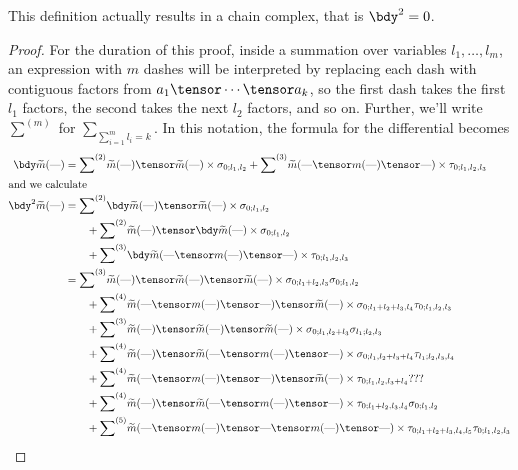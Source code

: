 \documentclass[11pt,leqno]{amsart}
\begin{document}
\begin{lem}
This definition actually results in a chain complex, that is $\bdy^2 = 0$.
\end{lem}
\begin{proof}
\newcommand{\T}{\text{---}}
\newcommand{\ssum}[1]{{\sum}^{(#1)}}
For the duration of this proof, inside a summation over variables $l_1, \ldots, l_m$, an expression with $m$ dashes will be interpreted
by replacing each dash with contiguous factors from $a_1 \tensor \cdots \tensor a_k$, so the first dash takes the first $l_1$ factors, the second
takes the next $l_2$ factors, and so on. Further, we'll write $\ssum{m}$ for $\sum_{\sum_{i=1}^m l_i = k}$.
In this notation, the formula for the differential becomes
\begin{align}
\notag
\bdy \tm(\T) & = \ssum{2} \tm(\T) \tensor \tm(\T) \times \sigma_{0;l_1,l_2} + \ssum{3} \tm(\T \tensor m(\T) \tensor \T) \times \tau_{0;l_1,l_2,l_3} \\
\intertext{and we calculate}
\notag
\bdy^2 \tm(\T) & = \ssum{2} \bdy \tm(\T) \tensor \tm(\T) \times \sigma_{0;l_1,l_2} \\
\notag         & \qquad + \ssum{2} \tm(\T) \tensor \bdy \tm(\T) \times \sigma_{0;l_1,l_2} \\
\notag         & \qquad + \ssum{3} \bdy \tm(\T \tensor m(\T) \tensor \T) \times \tau_{0;l_1,l_2,l_3} \\
\label{eq:d21} & = \ssum{3} \tm(\T) \tensor \tm(\T) \tensor \tm(\T) \times \sigma_{0;l_1+l_2,l_3} \sigma_{0;l_1,l_2} \\
\label{eq:d22} & \qquad + \ssum{4} \tm(\T \tensor m(\T) \tensor \T) \tensor \tm(\T) \times \sigma_{0;l_1+l_2+l_3,l_4} \tau_{0;l_1,l_2,l_3} \\
\label{eq:d23} & \qquad + \ssum{3} \tm(\T) \tensor \tm(\T) \tensor \tm(\T) \times \sigma_{0;l_1,l_2+l_3} \sigma_{l_1;l_2,l_3} \\
\label{eq:d24} & \qquad + \ssum{4} \tm(\T) \tensor \tm(\T \tensor m(\T) \tensor \T) \times \sigma_{0;l_1,l_2+l_3+l_4} \tau_{l_1;l_2,l_3,l_4} \\
\label{eq:d25} & \qquad + \ssum{4} \tm(\T \tensor m(\T) \tensor \T) \tensor \tm(\T) \times \tau_{0;l_1,l_2,l_3+l_4} ??? \\
\label{eq:d26} & \qquad + \ssum{4} \tm(\T) \tensor \tm(\T \tensor m(\T) \tensor \T) \times \tau_{0;l_1+l_2,l_3,l_4} \sigma_{0;l_1,l_2} \\
\label{eq:d27} & \qquad + \ssum{5} \tm(\T \tensor m(\T) \tensor \T \tensor m(\T) \tensor \T) \times \tau_{0;l_1+l_2+l_3,l_4,l_5} \tau_{0;l_1,l_2,l_3}  \\

\end{align}
\end{proof}
\end{document}
